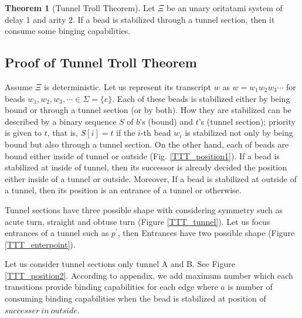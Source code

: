 \documentclass[a4,dvipdfmx,11pt]{article}
\theoremstyle{definition}
\newtheorem{myth}{Theorem}[section]
\begin{document}






\begin{myth}[Tunnel Troll Theorem]
  Let $\Xi$ be an unary oritatami system of delay 1 and arity 2. If a bead is stabilized through a tunnel section, then it consume some binging capabilities.
\end{myth}

\subsection{Proof of Tunnel Troll Theorem}
Assume $\Xi$ is deterministic. Let us represent its transcript $w$ as $w = w_1 w_2 w_3 \cdots$ for beads $w_1 , w_2 , w_3 , \cdots \in \Sigma = \{e\}$. Each of these beads is stabilized either by being bound or through a tunnel section (or by both). How they are stabilized can be described by a binary sequence $S$ of $b$'s (bound) and $t$'s (tunnel section); priority is given to $t$, that is, $S[i] = t$ if the $i$-th bead $w_i$ is stabilized not only by being bound but also through a tunnel section. On the other hand, each of beads are bound either inside of tunnel or outside (Fig. \ref{TTT_position1}). If a bead is stabilized at inside of tunnel, then its successor is already decided the position either inside of a tunnel or outside. Moreover, If a bead is stabilized at outside of a tunnel, then its position is an entrance of a tunnel or otherwise.


Tunnel sections have three possible shape with considering symmetry such as acute turn, straight and obtuse turn (Figure \ref{TTT_tunnel}). Let us focus entrances of a tunnel such as $p^\prime$, then Entrances have two possible shape (Figure \ref{TTT_enterpoint}).


Let us consider tunnel sections only tunnel A and B. See Figure \ref{TTT_position2}. According to appendix, we add maximum number which each transitions provide binding capabilities for each edge where $a$ is number of consuming binding capabilities when the bead is stabilized at position of $successer\ in\ outside$.
\end{document}

